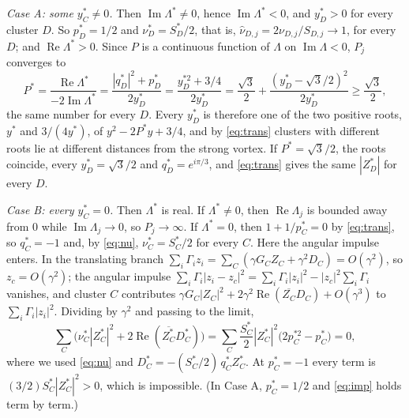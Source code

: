 \documentclass[11pt]{article}
\theoremstyle{definition}
\newcommand{\re}{\operatorname{Re}}
\newcommand{\im}{\operatorname{Im}}
\newcommand{\hnu}{\widehat{\nu}}
\begin{document}
\emph{Case A: some $y_C^* \ne 0$.} Then $\im\Lambda^* \ne 0$, hence $\im\Lambda^* < 0$, and $y_D^* > 0$ for every cluster $D$. So $p_D^* = 1/2$ and $\nu_D^* = S_D^*/2$, that is, $\hnu_{D,j} = 2\nu_{D,j}/S_{D,j} \to 1$, for every $D$; and $\re\Lambda^* > 0$. Since $P$ is a continuous function of $\Lambda$ on $\im\Lambda < 0$, $P_j$ converges to
\[
  P^* = \frac{\re\Lambda^*}{-2\im\Lambda^*} = \frac{|q_D^*|^2 + p_D^*}{2y_D^*} = \frac{y_D^{*2} + 3/4}{2y_D^*} = \frac{\sqrt{3}}{2} + \frac{(y_D^* - \sqrt{3}/2)^2}{2y_D^*} \ge \frac{\sqrt{3}}{2},
\]
the same number for every $D$. Every $y_D^*$ is therefore one of the two positive roots, $y^*$ and $3/(4y^*)$, of $y^2 - 2P^*y + 3/4$, and by \eqref{eq:trans} clusters with different roots lie at different distances from the strong vortex. If $P^* = \sqrt{3}/2$, the roots coincide, every $y_D^* = \sqrt{3}/2$ and $q_D^* = e^{i\pi/3}$, and \eqref{eq:trans} gives the same $|Z_D^*|$ for every $D$.

\emph{Case B: every $y_C^* = 0$.} Then $\Lambda^*$ is real. If $\Lambda^* \ne 0$, then $\re\Lambda_j$ is bounded away from $0$ while $\im\Lambda_j \to 0$, so $P_j \to \infty$. If $\Lambda^* = 0$, then $1 + 1/p_C^* = 0$ by \eqref{eq:trans}, so $q_C^* = -1$ and, by \eqref{eq:nu}, $\nu_C^* = S_C^*/2$ for every $C$. Here the angular impulse enters. In the translating branch $\sum_i \Gamma_iz_i = \sum_C(\gamma G_CZ_C + \gamma^2D_C) = O(\gamma^2)$, so $z_c = O(\gamma^2)$; the angular impulse $\sum_i\Gamma_i|z_i - z_c|^2 = \sum_i\Gamma_i|z_i|^2 - |z_c|^2\sum_i\Gamma_i$ vanishes, and cluster $C$ contributes $\gamma G_C|Z_C|^2 + 2\gamma^2\re(\overline{Z_C}D_C) + O(\gamma^3)$ to $\sum_i\Gamma_i|z_i|^2$. Dividing by $\gamma^2$ and passing to the limit,
\begin{equation}\label{eq:imp}
  \sum_C \bigl(\nu_C^*|Z_C^*|^2 + 2\re(\overline{Z_C^*}D_C^*)\bigr) = \sum_C \frac{S_C^*}{2}|Z_C^*|^2\bigl(2p_C^{*2} - p_C^*\bigr) = 0,
\end{equation}
where we used \eqref{eq:nu} and $D_C^* = -(S_C^*/2)\,q_C^*Z_C^*$. At $p_C^* = -1$ every term is $(3/2)S_C^*|Z_C^*|^2 > 0$, which is impossible. (In Case A, $p_C^* = 1/2$ and \eqref{eq:imp} holds term by term.)
\end{document}
